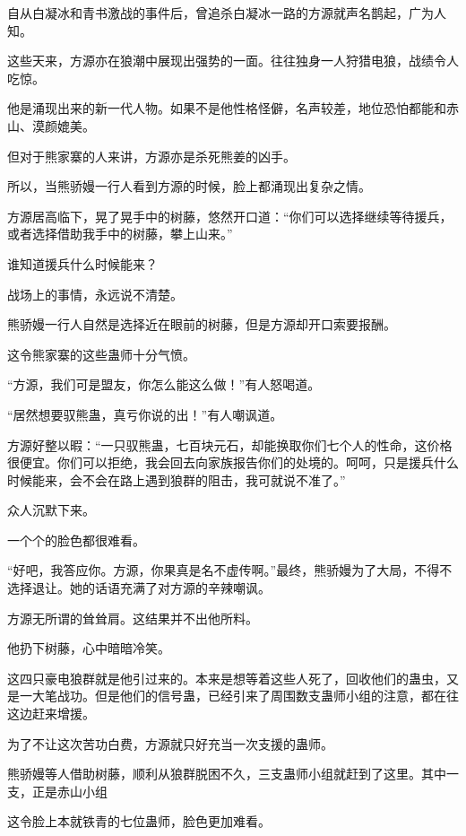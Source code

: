 
\begin{this_body}

自从白凝冰和青书激战的事件后，曾追杀白凝冰一路的方源就声名鹊起，广为人知。

这些天来，方源亦在狼潮中展现出强势的一面。往往独身一人狩猎电狼，战绩令人吃惊。

他是涌现出来的新一代人物。如果不是他性格怪僻，名声较差，地位恐怕都能和赤山、漠颜媲美。

但对于熊家寨的人来讲，方源亦是杀死熊姜的凶手。

所以，当熊骄嫚一行人看到方源的时候，脸上都涌现出复杂之情。

方源居高临下，晃了晃手中的树藤，悠然开口道：“你们可以选择继续等待援兵，或者选择借助我手中的树藤，攀上山来。”

谁知道援兵什么时候能来？

战场上的事情，永远说不清楚。

熊骄嫚一行人自然是选择近在眼前的树藤，但是方源却开口索要报酬。

这令熊家寨的这些蛊师十分气愤。

“方源，我们可是盟友，你怎么能这么做！”有人怒喝道。

“居然想要驭熊蛊，真亏你说的出！”有人嘲讽道。

方源好整以暇：“一只驭熊蛊，七百块元石，却能换取你们七个人的性命，这价格很便宜。你们可以拒绝，我会回去向家族报告你们的处境的。呵呵，只是援兵什么时候能来，会不会在路上遇到狼群的阻击，我可就说不准了。”

众人沉默下来。

一个个的脸色都很难看。

“好吧，我答应你。方源，你果真是名不虚传啊。”最终，熊骄嫚为了大局，不得不选择退让。她的话语充满了对方源的辛辣嘲讽。

方源无所谓的耸耸肩。这结果并不出他所料。

他扔下树藤，心中暗暗冷笑。

这四只豪电狼群就是他引过来的。本来是想等着这些人死了，回收他们的蛊虫，又是一大笔战功。但是他们的信号蛊，已经引来了周围数支蛊师小组的注意，都在往这边赶来增援。

为了不让这次苦功白费，方源就只好充当一次支援的蛊师。

熊骄嫚等人借助树藤，顺利从狼群脱困不久，三支蛊师小组就赶到了这里。其中一支，正是赤山小组

这令脸上本就铁青的七位蛊师，脸色更加难看。


\end{this_body}
